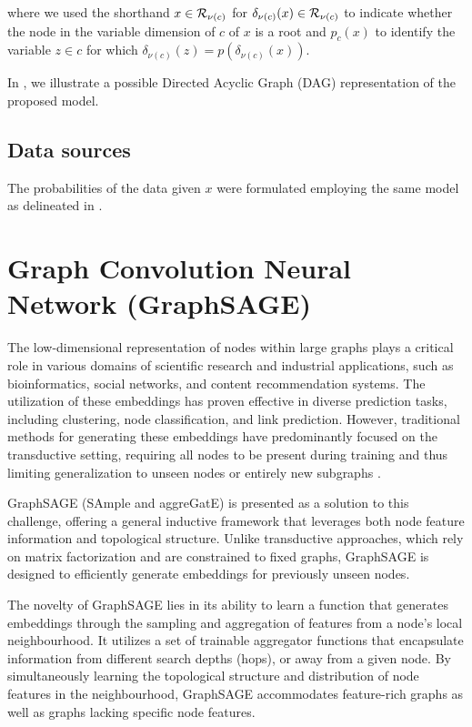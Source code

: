 \documentclass[
11pt, %
english, %
singlespacing, %
headsepline, %
chapterinoneline, %
]{MastersDoctoralThesis} %
\def\R{{\cal R}}
\begin{document}
where we used the shorthand $x \in \R_{\nu(c)}$ for $\delta_{\nu(c)}(x) \in \R_{\nu(c)}$ to indicate whether the node in the variable dimension of $c$ of $x$ is a root and $p_{c}(x)$ to identify the variable $z \in c$ for which $\delta_{\nu(c)}(z) = p(\delta_{\nu(c)}(x))$.


In , we illustrate a possible Directed Acyclic Graph (DAG) representation of the proposed model.

\subsection{Data sources}
The probabilities of the data given $x$ were formulated employing the same model as delineated in .

\section{Graph Convolution Neural Network (GraphSAGE)}\label{sec:theory:HinSAGE}
The low-dimensional representation of nodes within large graphs plays a critical role in various domains of scientific research and industrial applications, such as bioinformatics, social networks, and content recommendation systems. The utilization of these embeddings has proven effective in diverse prediction tasks, including clustering, node classification, and link prediction. However, traditional methods for generating these embeddings have predominantly focused on the transductive setting, requiring all nodes to be present during training and thus limiting generalization to unseen nodes or entirely new subgraphs \cite{groverNode2vecScalableFeature2016, perozziDeepWalkOnlineLearning2014}.

GraphSAGE (SAmple and aggreGatE) \cite{hamiltonInductiveRepresentationLearning2017} is presented as a solution to this challenge, offering a general inductive framework that leverages both node feature information and topological structure. Unlike transductive approaches, which rely on matrix factorization and are constrained to fixed graphs, GraphSAGE is designed to efficiently generate embeddings for previously unseen nodes.

The novelty of GraphSAGE lies in its ability to learn a function that generates embeddings through the sampling and aggregation of features from a node's local neighbourhood. It utilizes a set of trainable aggregator functions that encapsulate information from different search depths (hops), or away from a given node. By simultaneously learning the topological structure and distribution of node features in the neighbourhood, GraphSAGE accommodates feature-rich graphs as well as graphs lacking specific node features.
\end{document}
